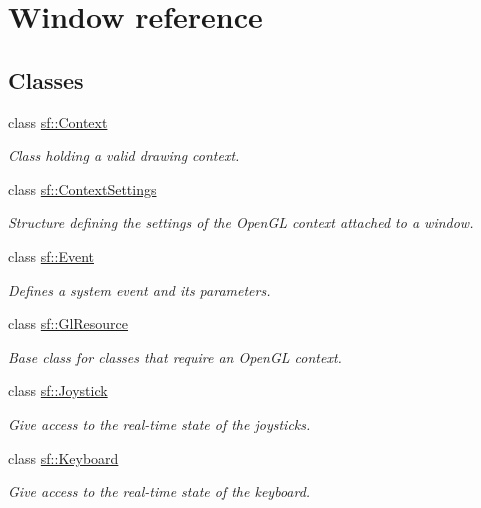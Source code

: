 \hypertarget{group__window}{}\section{Window reference}
\label{group__window}
\subsection*{Classes}
\begin{DoxyCompactItemize}
\item 
class \hyperlink{classsf_1_1_context}{sf\+::\+Context}
\begin{DoxyCompactList}\small\item\em Class holding a valid drawing context. \end{DoxyCompactList}\item 
class \hyperlink{structsf_1_1_context_settings}{sf\+::\+Context\+Settings}
\begin{DoxyCompactList}\small\item\em Structure defining the settings of the Open\+GL context attached to a window. \end{DoxyCompactList}\item 
class \hyperlink{classsf_1_1_event}{sf\+::\+Event}
\begin{DoxyCompactList}\small\item\em Defines a system event and its parameters. \end{DoxyCompactList}\item 
class \hyperlink{classsf_1_1_gl_resource}{sf\+::\+Gl\+Resource}
\begin{DoxyCompactList}\small\item\em Base class for classes that require an Open\+GL context. \end{DoxyCompactList}\item 
class \hyperlink{classsf_1_1_joystick}{sf\+::\+Joystick}
\begin{DoxyCompactList}\small\item\em Give access to the real-\/time state of the joysticks. \end{DoxyCompactList}\item 
class \hyperlink{classsf_1_1_keyboard}{sf\+::\+Keyboard}
\begin{DoxyCompactList}\small\item\em Give access to the real-\/time state of the keyboard. \end{DoxyCompactList}\item 

\end{DoxyCompactItemize}
